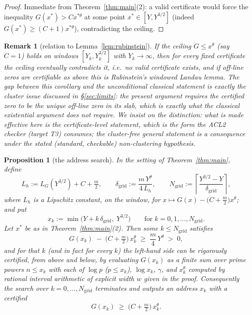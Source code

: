 \documentclass[11pt]{amsart}
\newtheorem{proposition}[theorem]{Proposition}
\newtheorem{remark}[theorem]{Remark}
\numberwithin{equation}{section}
\newcommand{\Euler}{\gamma}
\begin{document}
\begin{proof}
Immediate from Theorem~\ref{thm:main}(2): a valid certificate would
force the inequality $G(x^*) > Cx^{*\theta}$ at some point
$x^* \in [Y, Y^{3/2}]$ (indeed $G(x^*) \ge (C+1)x^{*\theta}$),
contradicting the ceiling.
\end{proof}

\begin{remark}[relation to Lemma~\ref{lem:rubinstein}]
If the ceiling $G \le x^{\theta}$ (say $C = 1$) holds on windows
$[Y_k, Y_k^{3/2}]$ with $Y_k \to \infty$, then for every fixed
certificate the ceiling eventually contradicts it, i.e.\ no valid
certificate exists, and if off-line zeros are certifiable as above
this is Rubinstein's windowed Landau lemma. The gap between this
corollary and the unconditional classical statement is exactly the
cluster issue discussed in \S\ref{sec:limits}: the present argument
requires the certified zero to be the unique off-line zero in its
slab, which is exactly what the classical existential argument does
\emph{not} require. We insist on the distinction: what is made
effective here is the certificate-level statement, which is the form
the ACL2 checker (target T3) consumes; the cluster-free general
statement is a consequence under the stated (standard, checkable)
non-clustering hypothesis.
\end{remark}

\begin{proposition}[the address search]\label{prop:search}
In the setting of Theorem~\ref{thm:main}, define
\[
L_h := L_G(Y^{3/2}) + C + \tfrac{m}{2},
\qquad
\delta_{\mathrm{grid}} := \frac{m\,Y^{\theta}}{4\,L_h},
\qquad
N_{\mathrm{grid}} := \left\lceil
\frac{Y^{3/2} - Y}{\delta_{\mathrm{grid}}} \right\rceil,
\]
where $L_h$ is a Lipschitz constant, on the window, for
$x \mapsto G(x) - \bigl(C + \tfrac{m}{2}\bigr)x^{\theta}$; and put
\[
x_k := \min\bigl(Y + k\,\delta_{\mathrm{grid}},\; Y^{3/2}\bigr)
\qquad\text{for } k = 0, 1, \ldots, N_{\mathrm{grid}} .
\]
Let $x^*$ be as in Theorem~\ref{thm:main}(2). Then some $k \le
N_{\mathrm{grid}}$ satisfies
\[
G(x_k) \;-\; \bigl(C + \tfrac{m}{2}\bigr)\,x_k^{\theta}
\;\ge\; \frac{m}{4}\,Y^{\theta} \;>\; 0,
\]
and for that $k$ (and in fact for every $k$) the left-hand side can be
rigorously certified, from above and below, by evaluating $G(x_k)$
as a finite sum over prime powers $n \le x_k$ with each of
$\log p$ ($p \le x_k$), $\log x_k$, $\Euler$, and $x_k^{\theta}$
computed by rational interval arithmetic of explicit width
$w$ given in the proof. Consequently the search over
$k = 0, \ldots, N_{\mathrm{grid}}$ terminates and outputs an address
$x_k$ with a certified
\[
G(x_k) \;\ge\; \bigl(C + \tfrac{m}{2}\bigr)\,x_k^{\theta}.
\]
\end{proposition}
\end{document}
